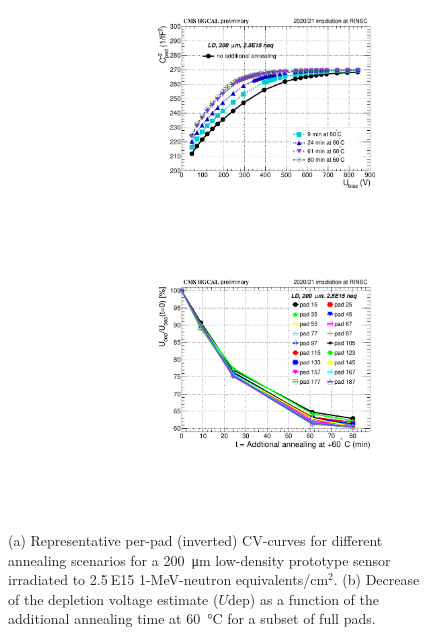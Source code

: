 \begin{figure}
	\captionsetup[subfigure]{aboveskip=-1pt,belowskip=-1pt}
	\centering
	\begin{subfigure}[b]{0.49\textwidth}
		\includegraphics[width=0.999\textwidth]{plots/annealing_Vdep/annealing_CV_ch24.pdf}
		\subcaption{
		}
		\label{plot:annealing_CV}
	\end{subfigure}
	\hfill
	\begin{subfigure}[b]{0.49\textwidth}
		\includegraphics[width=0.999\textwidth]{plots/annealing_Vdep/annealing_Vdep.pdf}
		\subcaption{
		}
		\label{plot:annealing_Vdep}
	\end{subfigure}
	\caption{
		(a) Representative per-pad (inverted) CV-curves for different annealing scenarios for a \SI{200}{\micro\metre} low-density prototype sensor irradiated to 2.5$~$E15 1-MeV-neutron equivalents/cm$^{2}$.
        (b) Decrease of the depletion voltage estimate ($U\text{dep}$) as a function of the additional annealing time at \SI{60}{\celsius} for a subset of full pads.
	}
\end{figure}